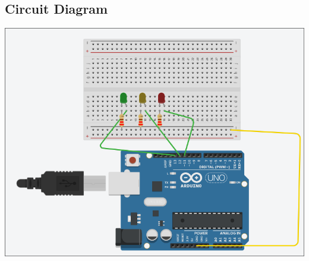 \documentclass[12pt]{article}
\begin{document}
\subsection{Circuit Diagram}
\includegraphics[width=1.0\textwidth]{Three_LED_Diagram.png}
\end{document}

